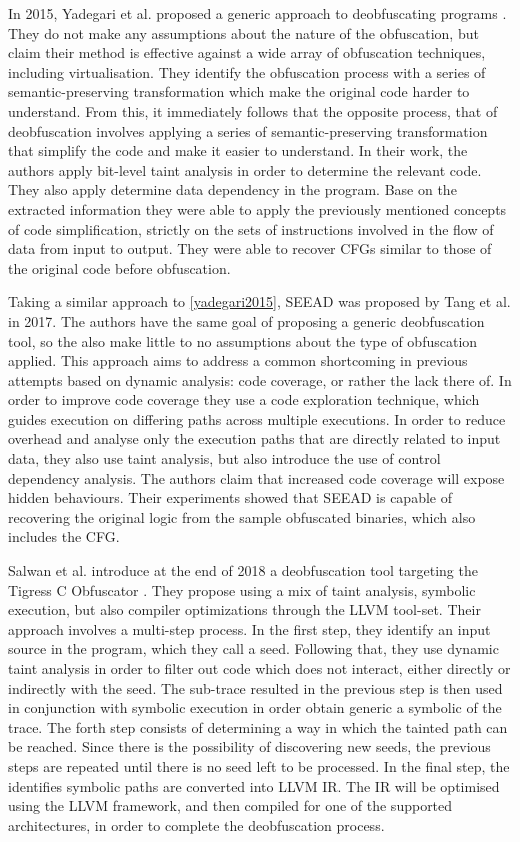 In 2015, Yadegari et al. proposed a generic approach to deobfuscating programs \cite{yadegari2015}. They do not make any assumptions about the nature of the obfuscation, but claim their method is effective against a wide array of obfuscation techniques, including virtualisation. They identify the obfuscation process with a series of semantic-preserving transformation which make the original code harder to understand. From this, it immediately follows that the opposite process, that of deobfuscation involves applying a series of semantic-preserving transformation that simplify the code and make it easier to understand. In their work, the authors apply bit-level taint analysis in order to determine the relevant code. They also apply determine data dependency in the program. Base on the extracted information they were able to apply the previously mentioned concepts of code simplification, strictly on the sets of instructions involved in the flow of data from input to output. They were able to recover \glspl{CFG} similar to those of the original code before obfuscation.

Taking a similar approach to \ref{yadegari2015}, SEEAD was proposed by Tang et al. in 2017. The authors have the same goal of proposing a generic deobfuscation tool, so the also make little to no assumptions about the type of obfuscation applied. This approach aims to address a common shortcoming in previous attempts based on dynamic analysis: code coverage, or rather the lack there of. In order to improve code coverage they use a code exploration technique, which guides execution on differing paths across multiple executions. In order to reduce overhead and analyse only the execution paths that are directly related to input data, they also use taint analysis, but also introduce the use of control dependency analysis. The authors claim that increased code coverage will expose hidden behaviours. Their experiments showed that SEEAD is capable of recovering the original logic from the sample obfuscated binaries, which also includes the \gls{CFG}.

Salwan et al. introduce at the end of 2018 a deobfuscation tool targeting the Tigress C Obfuscator \cite{tigress}. They propose using a mix of taint analysis, symbolic execution, but also compiler optimizations through the LLVM \cite{llvm} tool-set. Their approach involves a multi-step process. In the first step, they identify an input source in the program, which they call a seed. Following that, they use dynamic taint analysis in order to filter out code which does not interact, either directly or indirectly with the seed. The sub-trace resulted in the previous step is then used in conjunction with symbolic execution in order obtain generic a symbolic of the trace. The forth step consists of determining a way in which the tainted path can be reached. Since there is the possibility of discovering new seeds, the previous steps are repeated until there is no seed left to be processed. In the final step, the identifies symbolic paths are converted into LLVM \gls{IR}. The \gls{IR} will be optimised using the LLVM framework, and then compiled for one of the supported architectures, in order to complete the deobfuscation process.

